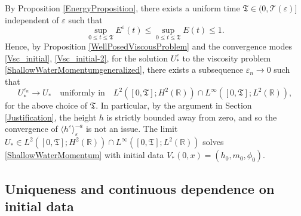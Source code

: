 \documentclass[reqno,11pt]{amsart}
\theoremstyle{plain}
\theoremstyle{definition}
\numberwithin{equation}{section}
\begin{document}
By Proposition \ref{EnergyProposition}, there exists a uniform time $\mathfrak{T}\in (0, \mathcal{T}(\varepsilon)]$ independent of $\varepsilon$ such that 
\begin{equation}
\label{UniformTime}
\sup_{0\leq t\leq \mathfrak{T}}E^{\varepsilon}(t)\leq \sup_{0\leq t\leq \mathfrak{T}} E(t)\leq 1.
\end{equation}
Hence, by Proposition \ref{WellPosedViscousProblem} and the convergence modes \eqref{Vsc_initial}, \eqref{Vsc_initial-2}, for the solution $U_*^{\varepsilon}$ to the viscosity problem \eqref{ShallowWaterMomentumgeneralized}, there exists a subsequence $\varepsilon_n\to 0$ such that 
\[
U_*^{\varepsilon_n}\rightarrow U_* \quad \text{uniformly in} \quad L^2([0,\mathfrak{T}];H^2(\mathbb{R}))\cap L^{\infty}([0,\mathfrak{T}];L^2(\mathbb{R})),
\]
for the above choice of $\mathfrak{T}$. In particular, by the argument in Section \ref{Justification}, the height $h$ is strictly bounded away from zero, and so the convergence of $\langle h^{\varepsilon}\rangle_{\varepsilon}^{-a}$ is not an issue. The limit $U_*\in L^2([0,\mathfrak{T}];H^2(\mathbb{R}))\cap L^{\infty}([0,\mathfrak{T}];L^2(\mathbb{R}))$ solves \eqref{ShallowWaterMomentum} with initial data $V_*(0,x)=(h_0,m_0,\phi_0)$.
\fi


\subsection{Uniqueness and continuous dependence on initial data}
\label{subsec:well-posedness-generalized}
\end{document}
